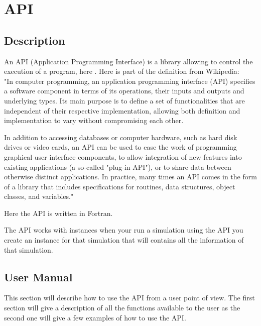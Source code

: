 \chapter{API}
\label{ch:API}

\section{Description}
%
An API (Application Programming Interface) is a library allowing to control the
execution of a program, here . Here is part of the definition from
Wikipedia:\\
"In computer programming, an application programming interface (API) specifies
a software component in terms of its operations, their inputs and outputs and
underlying types. Its main purpose is to define a set of functionalities that
are independent of their respective implementation, allowing both definition
and implementation to vary without compromising each other.

In addition to accessing databases or computer hardware, such as hard disk
drives or video cards, an API can be used to ease the work of programming
graphical user interface components, to allow integration of new features into
existing applications (a so-called "plug-in API"), or to share data between
otherwise distinct applications. In practice, many times an API comes in the
form of a library that includes specifications for routines, data structures,
object classes, and variables." 

Here the API is written in Fortran.

The API works with instances when your run a simulation using the API you
create an instance for that simulation that will contains all the information
of that simulation.


%
\section{User Manual}
%
This section will describe how to use the API from a user point of view. The
first section will give a description of all the functions available to the
user as the second one will give a few examples of how to use the API.
%
